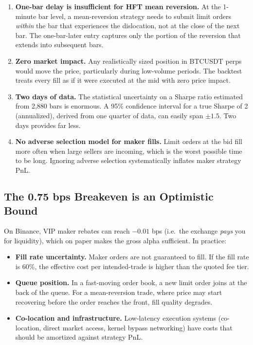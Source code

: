 \documentclass[11pt, a4paper]{article}
\begin{document}
\begin{enumerate}[leftmargin=2em, itemsep=0pt]
  \item \textbf{One-bar delay is insufficient for HFT mean reversion.}
        At the 1-minute bar level, a mean-reversion strategy needs to submit
        limit orders \textit{within} the bar that experiences the dislocation,
        not at the close of the next bar.  The one-bar-later entry captures
        only the portion of the reversion that extends into subsequent bars.
  \item \textbf{Zero market impact.}  Any realistically sized position in BTCUSDT
        perps would move the price, particularly during low-volume periods.
        The backtest treats every fill as if it were executed at the mid with
        zero price impact.
  \item \textbf{Two days of data.}  The statistical uncertainty on a Sharpe
        ratio estimated from 2{,}880 bars is enormous.
        A 95\% confidence interval for a true Sharpe of 2 (annualized),
        derived from one quarter of data, can easily span $\pm 1.5$.
        Two days provides far less.
  \item \textbf{No adverse selection model for maker fills.}
        Limit orders at the bid fill more often when large sellers are
        incoming, which is the worst possible time to be long.
        Ignoring adverse selection systematically inflates maker strategy PnL.
\end{enumerate}

\subsection{The 0.75 bps Breakeven is an Optimistic Bound}

On Binance, VIP maker rebates can reach $-0.01$ bps (i.e.\ the exchange
\textit{pays} you for liquidity), which on paper makes the gross alpha
sufficient.  In practice:

\begin{itemize}[leftmargin=2em, itemsep=2pt]
  \item \textbf{Fill rate uncertainty.}  Maker orders are not guaranteed to fill.
        If the fill rate is 60\%, the effective cost per intended-trade is
        higher than the quoted fee tier.
  \item \textbf{Queue position.}  In a fast-moving order book, a new limit
        order joins at the back of the queue.  For a mean-reversion trade,
        where price may start recovering before the order reaches the front,
        fill quality degrades.
  \item \textbf{Co-location and infrastructure.}  Low-latency execution
        systems (co-location, direct market access, kernel bypass networking)
        have costs that should be amortized against strategy PnL.
\end{itemize}
\end{document}
